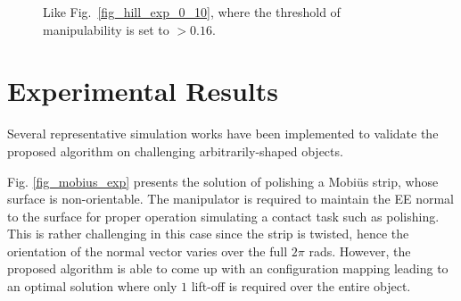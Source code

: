 \documentclass[journal]{IEEEtran}
\begin{document}
\begin{figure}[t]
\centering
{}
\caption{Like Fig.~\ref{fig_hill_exp_0_10}, where the threshold of manipulability is set to $> 0.16$. }
\label{fig_hill_exp_0_16}
\end{figure}


\section{Experimental Results}
\label{section_exp}
Several representative simulation works have been implemented to validate the proposed algorithm on challenging  arbitrarily-shaped objects.

Fig. \ref{fig_mobius_exp} presents the solution of polishing a Mobi\"{u}s strip, whose surface is non-orientable. The manipulator is required to maintain the EE normal to the surface for proper operation simulating a contact task such as polishing. This is rather challenging in this case 
since the strip is twisted, hence the orientation of the normal vector varies over the full $2\pi$ rads. However, the proposed algorithm 
is able to come up with an configuration mapping leading to an optimal solution where only $1$ lift-off is required over the entire object.
\end{document}
